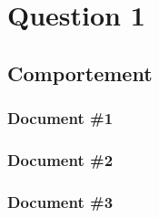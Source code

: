 \documentclass{DylCours}%
\begin{document}
%

\section{Question 1}
    \subsection{Comportement}
        \subsubsection{Document \#1}
        \subsubsection{Document \#2}
        \subsubsection{Document \#3}
\end{document}
